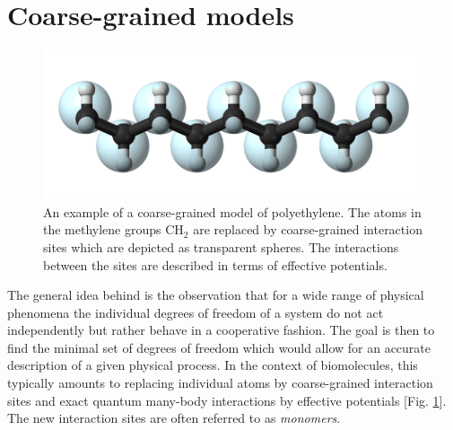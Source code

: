 \documentclass[12pt]{report}
\begin{document}
\section{Coarse-grained models}
%
\begin{figure}
\center
\includegraphics[width = 1.01\textwidth]{chapter4Figs/coarseGraining.png}
\caption{\label{fig:coarseGraining}%
An example of a coarse-grained model of polyethylene. The atoms in the methylene groups $\mathrm{CH}_{2}$ are replaced by coarse-grained interaction sites which are depicted as transparent spheres. The interactions between the sites are described in terms of effective potentials.
}
\end{figure}
% 
The general idea behind  is the observation that for a wide range of physical phenomena the individual degrees of freedom of a system do not act independently but rather behave in a cooperative fashion. The goal is then to find the minimal set of degrees of freedom which would allow for an accurate description of a given physical process. In the context of biomolecules, this typically amounts to replacing individual atoms by coarse-grained interaction sites and exact quantum many-body interactions by effective potentials [Fig. \ref{fig:coarseGraining}]. The new interaction sites are often referred to as \textit{monomers}. 
\end{document}
